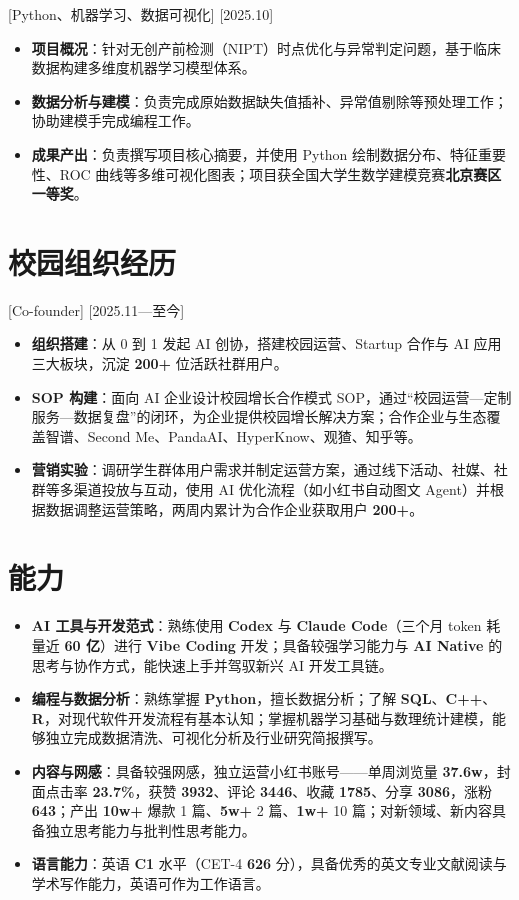 \documentclass{resume}
\begin{document}
[Python、机器学习、数据可视化]
[2025.10]
\begin{itemize}
  \item \textbf{项目概况}：针对无创产前检测（NIPT）时点优化与异常判定问题，基于临床数据构建多维度机器学习模型体系。
  \item \textbf{数据分析与建模}：负责完成原始数据缺失值插补、异常值剔除等预处理工作；协助建模手完成编程工作。
  \item \textbf{成果产出}：负责撰写项目核心摘要，并使用 Python 绘制数据分布、特征重要性、ROC 曲线等多维可视化图表；项目获全国大学生数学建模竞赛\textbf{北京赛区一等奖}。
\end{itemize}

\section{校园组织经历}

[Co-founder]
[2025.11—至今]
\begin{itemize}
  \item \textbf{组织搭建}：从 0 到 1 发起 AI 创协，搭建校园运营、Startup 合作与 AI 应用三大板块，沉淀 \textbf{200+} 位活跃社群用户。
  \item \textbf{SOP 构建}：面向 AI 企业设计校园增长合作模式 SOP，通过“校园运营—定制服务—数据复盘”的闭环，为企业提供校园增长解决方案；合作企业与生态覆盖智谱、Second Me、PandaAI、HyperKnow、观猹、知乎等。
  \item \textbf{营销实验}：调研学生群体用户需求并制定运营方案，通过线下活动、社媒、社群等多渠道投放与互动，使用 AI 优化流程（如小红书自动图文 Agent）并根据数据调整运营策略，两周内累计为合作企业获取用户 \textbf{200+}。
\end{itemize}

\section{能力}
\begin{itemize}
  \item \textbf{AI 工具与开发范式}：熟练使用 \textbf{Codex} 与 \textbf{Claude Code}（三个月 token 耗量近 \textbf{60 亿}）进行 \textbf{Vibe Coding} 开发；具备较强学习能力与 \textbf{AI Native} 的思考与协作方式，能快速上手并驾驭新兴 AI 开发工具链。
  \item \textbf{编程与数据分析}：熟练掌握 \textbf{Python}，擅长数据分析；了解 \textbf{SQL}、\textbf{C++}、\textbf{R}，对现代软件开发流程有基本认知；掌握机器学习基础与数理统计建模，能够独立完成数据清洗、可视化分析及行业研究简报撰写。
  \item \textbf{内容与网感}：具备较强网感，独立运营小红书账号——单周浏览量 \textbf{37.6w}，封面点击率 \textbf{23.7\%}，获赞 \textbf{3932}、评论 \textbf{3446}、收藏 \textbf{1785}、分享 \textbf{3086}，涨粉 \textbf{643}；产出 \textbf{10w+} 爆款 1 篇、\textbf{5w+} 2 篇、\textbf{1w+} 10 篇；对新领域、新内容具备独立思考能力与批判性思考能力。
  \item \textbf{语言能力}：英语 \textbf{C1} 水平（CET-4 \textbf{626} 分），具备优秀的英文专业文献阅读与学术写作能力，英语可作为工作语言。
\end{itemize}
\end{document}
